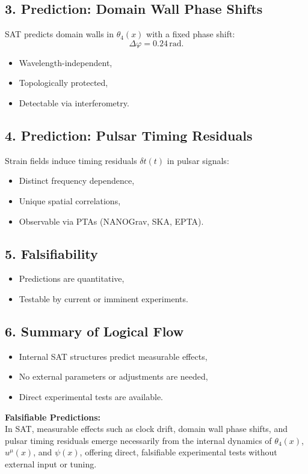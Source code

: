 \documentclass[12pt]{article}
\begin{document}
\subsection*{3. Prediction: Domain Wall Phase Shifts}
SAT predicts domain walls in \(\theta_4(x)\) with a fixed phase shift:
\[
\Delta \varphi = 0.24 \, \text{rad}.
\]
\begin{itemize}
    \item Wavelength-independent,
    \item Topologically protected,
    \item Detectable via interferometry.
\end{itemize}

\subsection*{4. Prediction: Pulsar Timing Residuals}
Strain fields induce timing residuals \(\delta t(t)\) in pulsar signals:
\begin{itemize}
    \item Distinct frequency dependence,
    \item Unique spatial correlations,
    \item Observable via PTAs (NANOGrav, SKA, EPTA).
\end{itemize}

\subsection*{5. Falsifiability}
\begin{itemize}
    \item Predictions are quantitative,
    \item Testable by current or imminent experiments.
\end{itemize}

\subsection*{6. Summary of Logical Flow}
\begin{itemize}
    \item Internal SAT structures predict measurable effects,
    \item No external parameters or adjustments are needed,
    \item Direct experimental tests are available.
\end{itemize}

\begin{mdframed}[linewidth=1pt, roundcorner=5pt, backgroundcolor=white]
\textbf{Falsifiable Predictions:} \\
In SAT, measurable effects such as clock drift, domain wall phase shifts, and pulsar timing residuals emerge necessarily from the internal dynamics of \( \theta_4(x) \), \( u^\mu(x) \), and \( \psi(x) \), offering direct, falsifiable experimental tests without external input or tuning.
\end{mdframed}
\end{document}
